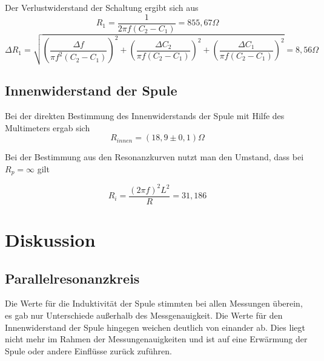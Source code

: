 Der Verlustwiderstand der Schaltung ergibt sich aus
\begin{equation}
R_1= \frac{1}{2\pi f (C_2-C_1)}=855,67\Omega
\end{equation}
\begin{equation}
\Delta R_1 = \sqrt{ \left( \dfrac{\Delta f}{\pi f^2 (C_2 - C_1)} \right)^2 + \left( \dfrac{\Delta C_2}{\pi f (C_2 - C_1)} \right)^2 + \left( \dfrac{\Delta C_1}{\pi f (C_2 - C_1)} \right)^2}=8,56\Omega
\end{equation}

\subsection{Innenwiderstand der Spule}

Bei der direkten Bestimmung des Innenwiderstands der Spule mit Hilfe des Multimeters ergab sich
\begin{equation}
R_{innen}=(18,9\pm0,1)\Omega
\end{equation}

Bei der Bestimmung aus den Resonanzkurven nutzt man den Umstand, dass bei $R_p = \infty$ gilt

\begin{equation}
R_i=\frac{(2\pi f)^2L^2}{R}=31,186
\end{equation}
\section{Diskussion}
\subsection{Parallelresonanzkreis}
Die Werte für die Induktivität der Spule stimmten bei allen Messungen überein, es gab nur Unterschiede außerhalb des Messgenauigkeit. Die Werte für den Innenwiderstand der Spule hingegen weichen deutlich von einander ab. Dies liegt nicht mehr im Rahmen der Messungenauigkeiten und ist auf eine Erwärmung der Spule oder andere Einflüsse zurück zuführen. 